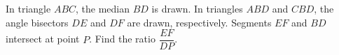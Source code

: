 In triangle $ABC$, the median $BD$ is drawn. In triangles $ABD$ and $CBD$, the angle bisectors $DE$ and $DF$ are drawn, respectively. Segments $EF$ and $BD$ intersect at point $P$. Find the ratio $\dfrac{EF}{DP}$.
